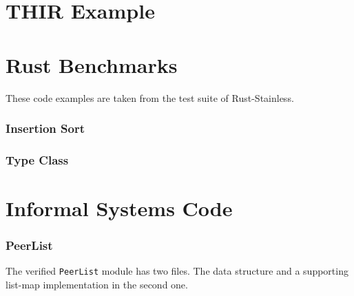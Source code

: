 \section{THIR Example}


\clearpage
\section{Rust Benchmarks}

These code examples are taken from the test suite of Rust-Stainless.

\subsubsection{Insertion Sort}


\subsubsection{Type Class}


\clearpage
\section{Informal Systems Code}

\subsubsection{PeerList}

The verified \lstinline!PeerList! module has two files. The data structure and
a supporting list-map implementation in the second one.




